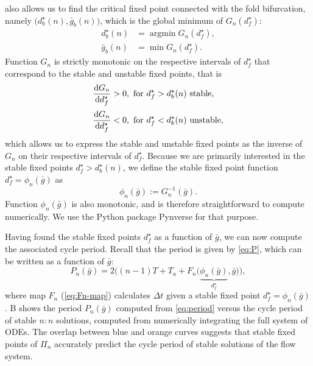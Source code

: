 \documentclass[utf8]{frontiersFPHY} %
\begin{document}
 also allows us to find the critical fixed point connected with the fold bifurcation, namely $\big(d^\star_b(n), \bar g_b(n)\big)$, which is the global minimum
of $G_n(d^\star_f)$:
\begin{align}
	d^\star_b(n) & = \operatorname{argmin} G_n(d^\star_f), \\
	\bar g_b(n)  & = \min{G_n(d^\star_f)}.
\end{align}
Function $G_n$ is strictly monotonic on the respective intervals of $d^\star_f$ that correspond to the stable and unstable fixed points, that is
\begin{align}
	\dv{G_n}{d^\star_f} & > 0, \text{ for } d^\star_f>d^\star_b(n) \text{ stable},   \\[0.5ex]
	\dv{G_n}{d^\star_f} & < 0, \text{ for } d^\star_f<d^\star_b(n) \text{ unstable},
\end{align}
which allows us to express the stable and unstable fixed points as the inverse of $G_n$ on their respective intervals of $d^\star_f$.
Because we are primarily interested in the stable fixed points $d^\star_f>d^\star_b(n)$, we define the stable fixed point function $d^\star_f = \phi_n(\bar g)$ as
\begin{equation}
	\label{eq:phi}
	\phi_n(\bar g):= G_n^{-1}(\bar g).
\end{equation}
Function $\phi_n(\bar g)$ is also monotonic, and is therefore straightforward to compute numerically.
We use the Python package Pynverse \citep{pynverse} for that purpose.

Having found the stable fixed points $d^\star_f$ as a function of $\bar g$, we can now compute the associated cycle period.
Recall that the period is given by \cref{eq:P}, which can be written as a function of $\bar g$:
\begin{equation}
	\label{eq:period}
	P_n(\bar g) = 2 \Big(
	(n-1)T + T_{a} + F_n\big(\underbrace{\phi_n(\bar g)}_{d^\star_f}, \bar g\big)
	\Big),
\end{equation}
where map $F_n$ (\cref{eq:Fn-map}) calculates $\Delta t$ given a stable fixed point $d^\star_f=\phi_n(\bar g)$.
B shows the period $P_{n}(\bar g)$ computed from \cref{eq:period} versus the cycle period of stable $n:n$ solutions, computed from numerically integrating the full system of ODEs.
The overlap between blue and orange curves suggests that stable fixed points of $\Pi_{n}$ accurately predict the cycle period of stable solutions of the flow system.
\end{document}
